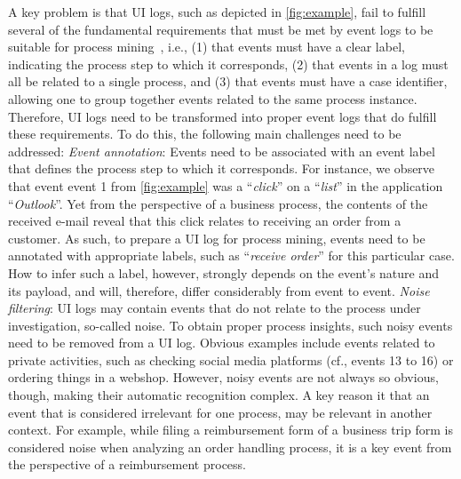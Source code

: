  A key problem is that UI logs, such as depicted in \autoref{fig:example}, fail to fulfill several of the fundamental requirements that must be met by event logs to be suitable for process mining~\cite{van2016data}, i.e., (1) that events must have a clear label, indicating the process step to which it corresponds, (2) that events in a log must all be related to a single process, and (3) that events must have a case identifier, allowing one to group together events related to the same process instance. Therefore, UI logs need to be transformed into proper event logs that do fulfill these requirements. To do this, the following main challenges need to be addressed:
\vspace{0.2em}
\newline%
\textit{Event annotation}: Events need to be associated with an event label that defines the process step to which it corresponds. For instance, we observe that event event 1 from \autoref{fig:example} was a ``\textit{click}'' on a ``\textit{list}'' in the application ``\textit{Outlook}''. Yet from the perspective of a business process, the contents of the received e-mail reveal that this click relates to receiving an order from a customer. As such, to prepare a UI log for process mining, events need to be annotated with appropriate labels, such as ``\emph{receive order}'' for this particular case. How to infer such a label, however, strongly depends on the event's nature and its payload, and will, therefore, differ considerably from event to event.
\vspace{0.2em}
\newline%
\noindent \textit{Noise filtering}: UI logs may contain events that do not relate to the process under investigation, so-called noise. To obtain proper process insights, such noisy events need to be removed from a UI log. Obvious examples include events related to private activities, such as checking social media platforms (cf., events 13 to 16) or ordering things in a webshop. 
However, noisy events are not always so obvious, though, making their automatic recognition complex.
A key reason it that an event that is considered irrelevant for one process, may be relevant in another context. For example, while filing a reimbursement form of a business trip form is considered noise when analyzing an order handling process, it is a key event from the perspective of a reimbursement process.
